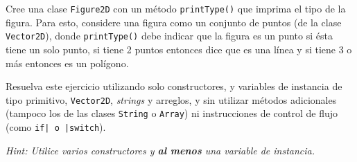     \begin{exercise}
      Cree una clase \texttt{Figure2D} con un método \texttt{printType()}
      que imprima el tipo de la figura.
      Para esto, considere una figura como un conjunto de puntos (de la clase 
      \texttt{Vector2D}), donde \texttt{printType()} debe indicar que
      la figura es un punto si ésta tiene un solo punto, si tiene 2 puntos entonces dice 
      que es una línea y si tiene 3 o más entonces es un polígono.

      Resuelva este ejercicio utilizando solo constructores, y variables de instancia de 
      tipo primitivo, \texttt{Vector2D}, \textit{strings} y arreglos, y sin
      utilizar métodos adicionales (tampoco los de las clases \texttt{String} o 
      \texttt{Array}) ni instrucciones de control de flujo (como 
      \texttt{if| o |switch}).

      \textit{Hint: Utilice varios constructores y \textbf{al menos} una variable de 
      instancia.}
    \end{exercise}
%